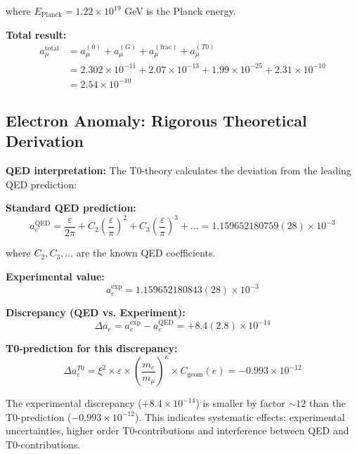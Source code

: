 \documentclass[12pt,a4paper]{article}
\numberwithin{equation}{section}
\newcommand{\xipar}{\xi}
\newcommand{\epsilonT}{\varepsilon}
\newcommand{\Cgeom}{C_{\text{geom}}}
\newcommand{\kappaT}{\kappa}
\begin{document}
	where $E_{\text{Planck}} = 1.22 \times 10^{19}$ GeV is the Planck energy.
	
	\textbf{Total result:}
	\begin{align}
		a_\mu^{\text{total}} &= a_\mu^{(0)} + a_\mu^{(G)} + a_\mu^{(\text{frac})} + a_\mu^{(T0)}\\
		&= 2.302 \times 10^{-11} + 2.07 \times 10^{-13} + 1.99 \times 10^{-25} + 2.31 \times 10^{-10}\\
		&= 2.54 \times 10^{-10}
		\label{eq:muon_total}
	\end{align}
	
	\subsection{Electron Anomaly: Rigorous Theoretical Derivation}
	
	\textbf{QED interpretation:}
	The T0-theory calculates the deviation from the leading QED prediction:
	
	\textbf{Standard QED prediction:}
	\begin{equation}
		a_e^{\text{QED}} = \frac{ \epsilonT}{2\pi} + C_2\left(\frac{ \epsilonT}{\pi}\right)^2 + C_3\left(\frac{ \epsilonT}{\pi}\right)^3 + \ldots = 1.159652180759(28) \times 10^{-3}
		\label{eq:qed_prediction}
	\end{equation}
	
	where $C_2, C_3, \ldots$ are the known QED coefficients.
	
	\textbf{Experimental value:}
	\begin{equation}
		a_e^{\exp} = 1.159652180843(28) \times 10^{-3}
		\label{eq:electron_exp}
	\end{equation}
	
	\textbf{Discrepancy (QED vs. Experiment):}
	\begin{equation}
		\Delta a_e = a_e^{\exp} - a_e^{\text{QED}} = +8.4(2.8) \times 10^{-14}
		\label{eq:electron_discrepancy}
	\end{equation}
	
	\textbf{T0-prediction for this discrepancy:}
	\begin{equation}
		\Delta a_e^{T0} = \xipar^2 \times \epsilonT \times \left(\frac{m_e}{m_\mu}\right)^{\kappaT} \times \Cgeom(e) = -0.993 \times 10^{-12}
		\label{eq:electron_t0}
	\end{equation}
	
	The experimental discrepancy ($+8.4 \times 10^{-14}$) is smaller by factor $\sim 12$ than the T0-prediction ($-0.993 \times 10^{-12}$). This indicates systematic effects: experimental uncertainties, higher order T0-contributions and interference between QED and T0-contributions.
	
\end{document}
